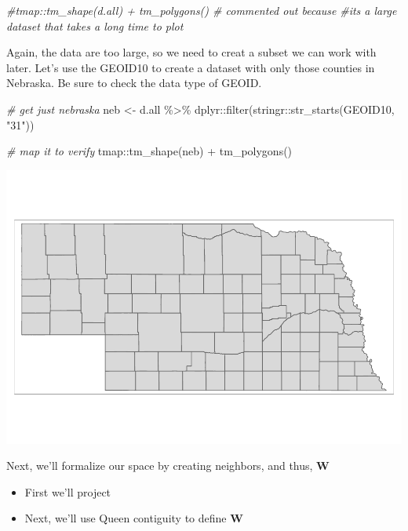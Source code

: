 \documentclass[]{article}
\newenvironment{Shaded}{\begin{snugshade}}{\end{snugshade}}
\newcommand{\CommentTok}[1]{\textcolor[rgb]{0.56,0.35,0.01}{\textit{#1}}}
\newcommand{\FunctionTok}[1]{\textcolor[rgb]{0.00,0.00,0.00}{#1}}
\newcommand{\NormalTok}[1]{#1}
\newcommand{\OtherTok}[1]{\textcolor[rgb]{0.56,0.35,0.01}{#1}}
\newcommand{\SpecialCharTok}[1]{\textcolor[rgb]{0.00,0.00,0.00}{#1}}
\newcommand{\StringTok}[1]{\textcolor[rgb]{0.31,0.60,0.02}{#1}}
\providecommand{\tightlist}{%
  \setlength{\itemsep}{0pt}\setlength{\parskip}{0pt}}
\begin{document}
\begin{Shaded}
\begin{Highlighting}[]
\CommentTok{\#tmap::tm\_shape(d.all) + tm\_polygons() \# commented out because }
\CommentTok{\#it\textquotesingle{}s a large dataset that takes a long time to plot}
\end{Highlighting}
\end{Shaded}

Again, the data are too large, so we need to creat a subset we can work
with later. Let's use the GEOID10 to create a dataset with only those
counties in Nebraska. Be sure to check the data type of GEOID.

\begin{Shaded}
\begin{Highlighting}[]
\CommentTok{\# get just nebraska}
\NormalTok{neb }\OtherTok{\textless{}{-}}\NormalTok{ d.all }\SpecialCharTok{\%\textgreater{}\%}\NormalTok{ dplyr}\SpecialCharTok{::}\FunctionTok{filter}\NormalTok{(stringr}\SpecialCharTok{::}\FunctionTok{str\_starts}\NormalTok{(GEOID10, }\StringTok{"31"}\NormalTok{))}

\CommentTok{\# map it to verify}
\NormalTok{tmap}\SpecialCharTok{::}\FunctionTok{tm\_shape}\NormalTok{(neb) }\SpecialCharTok{+} \FunctionTok{tm\_polygons}\NormalTok{()}
\end{Highlighting}
\end{Shaded}

\includegraphics{lab03_files/figure-latex/make_subset-1.pdf}

Next, we'll formalize our space by creating neighbors, and thus,
\textbf{W}

\begin{itemize}
\tightlist
\item
  First we'll project
\item
  Next, we'll use Queen contiguity to define \textbf{W}
\end{itemize}
\end{document}
